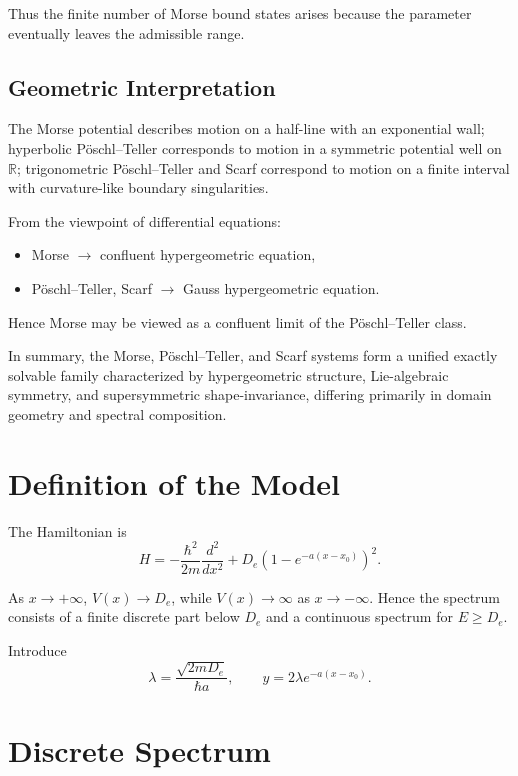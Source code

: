 \documentclass[11pt]{article}
\begin{document}
Thus the finite number of Morse bound states arises because the
parameter eventually leaves the admissible range.

\subsection{Geometric Interpretation}

The Morse potential describes motion on a half-line with an
exponential wall; hyperbolic Pöschl--Teller corresponds to motion in a
symmetric potential well on $\mathbb{R}$; trigonometric
Pöschl--Teller and Scarf correspond to motion on a finite interval
with curvature-like boundary singularities.

From the viewpoint of differential equations:

\begin{itemize}
\item Morse $\rightarrow$ confluent hypergeometric equation,
\item Pöschl--Teller, Scarf $\rightarrow$ Gauss hypergeometric equation.
\end{itemize}

Hence Morse may be viewed as a confluent limit of the
Pöschl--Teller class.

\medskip

In summary, the Morse, Pöschl--Teller, and Scarf systems form a
unified exactly solvable family characterized by hypergeometric
structure, Lie-algebraic symmetry, and supersymmetric
shape-invariance, differing primarily in domain geometry and spectral
composition.

\section{Definition of the Model}

The Hamiltonian is
\begin{equation}
H=-\frac{\hbar^2}{2m}\frac{d^2}{dx^2}
+D_e\left(1-e^{-a(x-x_0)}\right)^2.
\end{equation}

As $x\to+\infty$, $V(x)\to D_e$,
while $V(x)\to\infty$ as $x\to-\infty$.
Hence the spectrum consists of a finite discrete part below $D_e$
and a continuous spectrum for $E\ge D_e$.

Introduce
\begin{equation}
\lambda=\frac{\sqrt{2mD_e}}{\hbar a},
\qquad
y=2\lambda e^{-a(x-x_0)}.
\end{equation}

\section{Discrete Spectrum}
\end{document}
